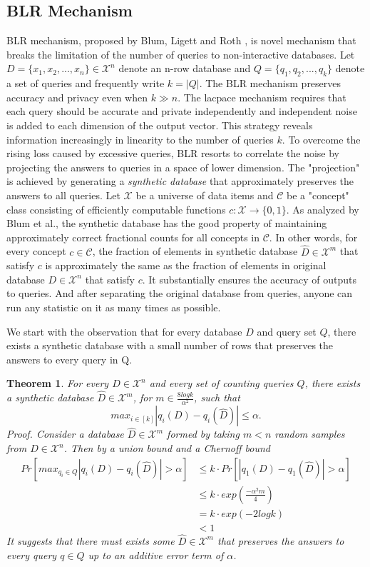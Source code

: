 \documentclass[a4paper, 11pt]{article} %
\makeatletter
\DeclareRobustCommand{\etal}{et al.\@\xspace}
\newtheorem{theorem}{Theorem}
\makeatother
\begin{document}
\subsection{BLR Mechanism}
BLR mechanism, proposed by Blum, Ligett and Roth \cite{blum2013learning}, is novel mechanism that breaks the limitation of the number of queries to non-interactive databases. Let $D = \{x_1, x_2, ..., x_n\} \in \mathcal{X}^n$ denote an n-row database and $Q=\{q_1, q_2, ..., q_k\}$ denote a set of queries and frequently write $k=|Q|$. The BLR mechanism preserves accuracy and privacy even when $k \gg n$. The lacpace mechanism requires that each query should be accurate and private independently and independent noise is added to each dimension of the output vector. This strategy reveals information increasingly in linearity to the number of queries $k$. To overcome the rising loss caused by excessive queries, BLR resorts to correlate the noise by projecting the answers to queries in a space of lower dimension. The "projection" is achieved by generating a \textit{synthetic database} that approximately preserves the answers to all queries. Let $\mathcal{X}$ be a universe of data items and $\mathcal{C}$ be a "concept" class consisting of efficiently computable functions $c: \mathcal{X} \rightarrow \{ 0, 1\}$. As analyzed by Blum \etal \cite{blum2013learning}, the synthetic database has the good property of maintaining approximately correct fractional counts for all concepts in $\mathcal{C}$. In other words, for every concept $c \in \mathcal{C}$, the fraction of elements in synthetic database $\hat{D} \in \mathcal{X}^m$ that satisfy $c$ is approximately the same as the fraction of elements in original database $D \in \mathcal{X}^n$ that satisfy $c$. It substantially ensures the accuracy of outputs to queries. And after separating the original database from queries, anyone can run any statistic on it as many times as possible.

We start with the observation that for every database $D$ and query set $Q$, there exists a synthetic database with a small number of rows that preserves the answers to every query in Q.

\begin{theorem}
\textit{
For every $D \in \mathcal{X}^n$ and every set of counting queries $Q$, there exists a synthetic database $\hat{D} \in \mathcal{X}^m$, for $m \in \frac{8logk}{\alpha^2}$, such that
$$ max_{i \in [k]} | q_i(D) - q_i(\hat{D}) | \leq \alpha. $$
Proof. Consider a database $\hat{D}\in \mathcal{X}^m$ formed by taking $m < n$ random samples from $D \in \mathcal{X}^n$. Then by a union bound and a Chernoff bound
\begin{align}
Pr\left[ max_{q_i \in Q} | q_i(D) - q_i(\hat{D})   | > \alpha \right]
&\leq  k \cdot Pr \left[ | q_1(D) - q_1(\hat{D})   |  > \alpha  \right] \\
& \leq k \cdot exp\left( \frac{-\alpha^2 m}{4} \right) \\
&= k \cdot exp(-2logk) \\
& < 1
\end{align}
}
It suggests that there must exists some $\hat{D} \in \mathcal{X}^m$ that preserves the answers to every query $q \in Q$ up to an additive error term of $\alpha$.
\end{theorem}
\end{document}
